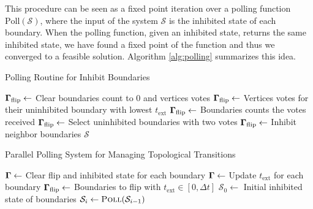 This procedure can be seen as a fixed point iteration over a polling function $\text{Poll}(\mathcal{S})$, where the input of the system $\mathcal{S}$ is the inhibited state of each boundary. When the polling function, given an inhibited state, returns the same inhibited state, we have found a fixed point of the function and thus we converged to a feasible solution. Algorithm \ref{alg:polling} summarizes this idea.
\begin{algorithm}
\caption{Polling Routine for Inhibit Boundaries}
\label{alg:pollroutine}
\begin{algorithmic}[1]
\State $\bm{\Gamma}_{\text{flip}} \gets$ Clear boundaries count to 0 and vertices votes
\State $\bm{\Gamma}_{\text{flip}} \gets$ Vertices votes for their uninhibited boundary with lowest $t_{\text{ext}}$
\State $\bm{\Gamma}_{\text{flip}} \gets$ Boundaries counts the votes received
\State $\bm{\Gamma}_{\text{flip}} \gets$ Select uninhibited boundaries with two votes
\State $\bm{\Gamma}_{\text{flip}} \gets$ Inhibit neighbor boundaries
\State \Return $\mathcal{S}$ 
\EndProcedure
\end{algorithmic}
\end{algorithm}

\begin{algorithm}
\caption{Parallel Polling System for Managing Topological Transitions}
\label{alg:polling}
\begin{algorithmic}[1]
\State $\bm{\Gamma} \gets$ Clear flip and inhibited state for each boundary
\State $\bm{\Gamma} \gets$ Update $t_{\text{ext}}$ for each boundary
\State $\bm{\Gamma}_{\text{flip}} \gets$ Boundaries to flip with $t_{\text{ext}} \in [0, \Delta t]$
\State $\mathcal{S}_0 \gets$ Initial inhibited state of boundaries
    \State $\mathcal{S}_i \gets \textsc{Poll}(\mathcal{S}_{i-1})$
    \State \Return
    \EndIf
\EndFor
\EndProcedure
\end{algorithmic}
\end{algorithm}

